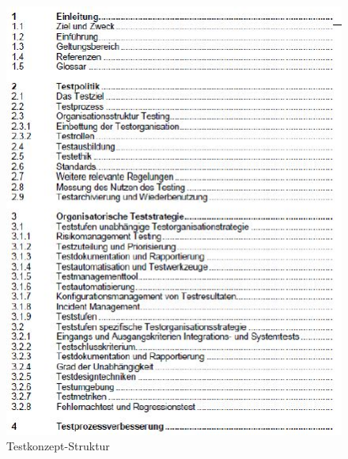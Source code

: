 \begin{figure}[h!]
\centering
\includegraphics[width=0.6\linewidth]{fig/testkonzept-struktur}
\caption{Testkonzept-Struktur}
\label{fig:testkonzept-struktur}
\end{figure}
